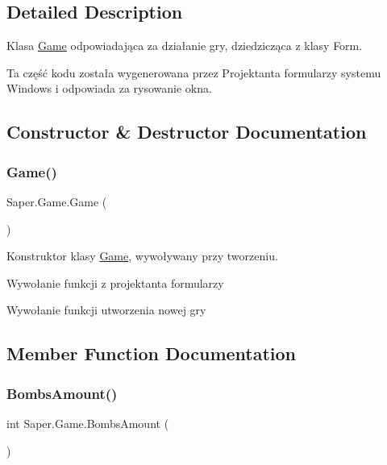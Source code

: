 \subsection{Detailed Description}
Klasa \mbox{\hyperlink{class_saper_1_1_game}{Game}} odpowiadająca za działanie gry, dziedzicząca z klasy Form. 

Ta część kodu została wygenerowana przez Projektanta formularzy systemu Windows i odpowiada za rysowanie okna. 

\subsection{Constructor \& Destructor Documentation}
\mbox{\label{class_saper_1_1_game_a9d694a044fb311e088ce585b716a9d84}} 
\subsubsection{\texorpdfstring{Game()}{Game()}}
{\footnotesize\ttfamily Saper.\+Game.\+Game (\begin{DoxyParamCaption}{ }\end{DoxyParamCaption})}



Konstruktor klasy \mbox{\hyperlink{class_saper_1_1_game}{Game}}, wywoływany przy tworzeniu. 

Wywołanie funkcji z projektanta formularzy

Wywołanie funkcji utworzenia nowej gry 

\subsection{Member Function Documentation}
\mbox{\label{class_saper_1_1_game_a68a874323b134ee545e72de1d332f11a}} 
\subsubsection{\texorpdfstring{BombsAmount()}{BombsAmount()}}
{\footnotesize\ttfamily int Saper.\+Game.\+Bombs\+Amount (\begin{DoxyParamCaption}{ }\end{DoxyParamCaption})}

